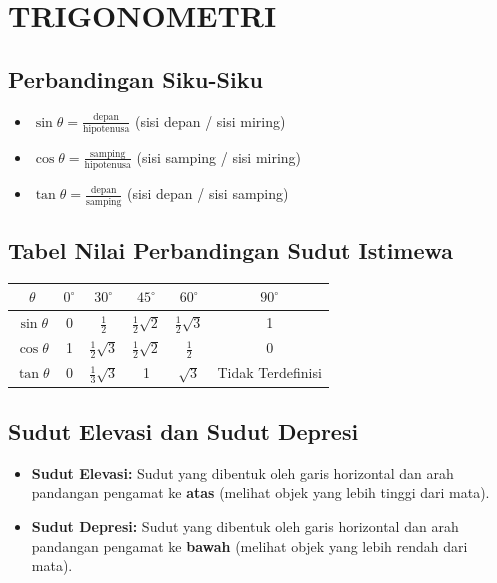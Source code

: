 \documentclass[12pt, a4paper]{article}
\begin{document}
\section{TRIGONOMETRI}

\subsection{Perbandingan Siku-Siku}
\begin{itemize}
    \item $\sin\theta = \frac{\text{depan}}{\text{hipotenusa}}$ (sisi depan / sisi miring)
    \item $\cos\theta = \frac{\text{samping}}{\text{hipotenusa}}$ (sisi samping / sisi miring)
    \item $\tan\theta = \frac{\text{depan}}{\text{samping}}$ (sisi depan / sisi samping)
\end{itemize}

\subsection{Tabel Nilai Perbandingan Sudut Istimewa}
\begin{center}
    \begin{tabular}{cccccc}
        \toprule
        $\theta$ & $0^\circ$ & $30^\circ$ & $45^\circ$ & $60^\circ$ & $90^\circ$ \\
        \midrule
        $\sin\theta$ & 0 & $\frac{1}{2}$ & $\frac{1}{2}\sqrt{2}$ & $\frac{1}{2}\sqrt{3}$ & 1 \\
        \midrule
        $\cos\theta$ & 1 & $\frac{1}{2}\sqrt{3}$ & $\frac{1}{2}\sqrt{2}$ & $\frac{1}{2}$ & 0 \\
        \midrule
        $\tan\theta$ & 0 & $\frac{1}{3}\sqrt{3}$ & 1 & $\sqrt{3}$ & Tidak Terdefinisi \\
        \bottomrule
    \end{tabular}
\end{center}

\subsection{Sudut Elevasi dan Sudut Depresi}
\begin{itemize}
    \item \textbf{Sudut Elevasi:} Sudut yang dibentuk oleh garis horizontal dan arah pandangan pengamat ke \textbf{atas} (melihat objek yang lebih tinggi dari mata).
    \item \textbf{Sudut Depresi:} Sudut yang dibentuk oleh garis horizontal dan arah pandangan pengamat ke \textbf{bawah} (melihat objek yang lebih rendah dari mata).
\end{itemize}
\end{document}
